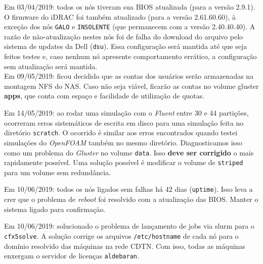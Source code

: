 Em 03/04/2019: todos os nós tiveram sua BIOS atualizada (para a versão 2.9.1). O firmware do iDRAC foi também atualizado (para a versão 2.61.60.60), à exceção dos nós \texttt{GALO} e \texttt{INSOLENTE} (que permanecem com a versão 2.40.40.40). A razão de não-atualização nestes nós foi de falha do download do arquivo pelo sistema de updates da Dell (\texttt{dsu}). Essa configuração será mantida 
até que seja feitos testes e, caso nenhum nó apresente comportamento errático, 
a configuração sem atualização será mantida.\\


Em 09/05/2019: ficou decidido que as contas dos usuários serão armazenadas na 
montagem NFS do NAS. Caso não seja viável, ficarão as contas no volume gluster 
\textbf{apps}, que conta com espaço e facilidade de utilização de quotas.

Em 14/05/2019: ao rodar uma simulação com o \textit{Fluent} entre 30 e 44 partições, ocorreram erros sistemáticos de escrita em disco para uma simulação 
feita no diretório \texttt{scratch}. O ocorrido é similar aos erros encontrados 
quando testei simulações do \textit{OpenFOAM} também no mesmo diretório. 
Diagnosticamos isso como um problema do \textit{Gluster} no volume \texttt{data}.
Isso \textbf{deve ser corrigido} o mais rapidamente possível. Uma solução possível 
é modificar o volume de \texttt{striped} para um volume sem redundância.

Em 10/06/2019: todos os nós ligados sem falhas há 42 dias (\texttt{uptime}).
Isso leva a crer que o problema de \textit{reboot} foi resolvido com a
atualização das BIOS. Manter o sistema ligado para confirmação.

Em 10/06/2019: solucionado o problema de lançamento de jobs via slurm para 
o \texttt{cfx5solve}. A solução corrige os arquivos \texttt{/etc/hostname} de cada 
nó para o domínio resolvido das máquinas na rede CDTN. Com isso, todas as máquinas 
enxergam o servidor de licenças \texttt{aldebaran}.


